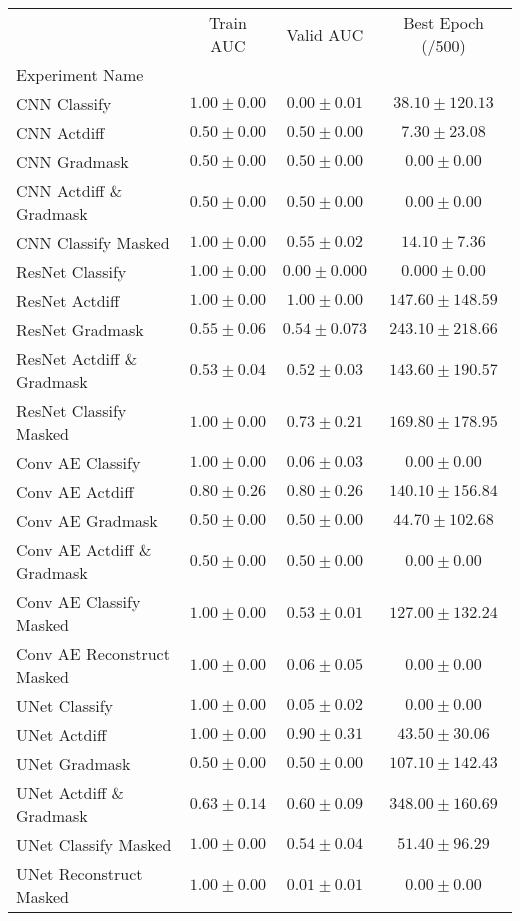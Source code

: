 \begin{tabular}{lccc}
\toprule
{} &        Train AUC &        Valid AUC &           Best Epoch (/500) \\
Experiment Name        &                  &                  &                      \\
\midrule
CNN Classify      &  $1.00\pm0.00$ &  $0.00\pm0.01$ &   $38.10\pm120.13$ \\
CNN Actdiff       &  $0.50\pm0.00$ &  $0.50\pm0.00$ &     $7.30\pm23.08$ \\
CNN Gradmask      &  $0.50\pm0.00$ &  $0.50\pm0.00$ &      $0.00\pm0.00$ \\
CNN Actdiff \& Gradmask  &  $0.50\pm0.00$ &  $0.50\pm0.00$ &      $0.00\pm0.00$ \\
CNN Classify Masked     &  $1.00\pm0.00$ &  $0.55\pm0.02$ &     $14.10\pm7.36$ \\
\midrule
ResNet Classify   &  $1.00\pm0.00$ &  $0.00\pm0.000$ &      $0.000\pm0.00$ \\
ResNet Actdiff    &  $\mathbf{1.00\pm0.00}$ &  $\mathbf{1.00\pm0.00}$ &  $\mathbf{147.60\pm148.59}$ \\
ResNet Gradmask   &  $0.55\pm0.06$ &  $0.54\pm0.073$ &  $243.10\pm218.66$ \\
ResNet Actdiff \& Gradmask   &  $0.53\pm0.04$ &  $0.52\pm0.03$ &  $143.60\pm190.57$ \\
ResNet Classify Masked       &  $1.00\pm0.00$ &  $0.73\pm0.21$ &  $169.80\pm178.95$ \\
\midrule
Conv AE Classify      &  $1.00\pm0.00$ &  $0.06\pm0.03$ &      $0.00\pm0.00$ \\
Conv AE Actdiff       &  $\mathbf{0.80\pm0.26}$ &  $\mathbf{0.80\pm0.26}$ &  $\mathbf{140.10\pm156.84}$ \\
Conv AE Gradmask      &  $0.50\pm0.00$ &  $0.50\pm0.00$ &   $44.70\pm102.68$ \\
Conv AE Actdiff \& Gradmask &  $0.50\pm0.00$ &  $0.50\pm0.00$ &      $0.00\pm0.00$ \\
Conv AE Classify Masked    &  $1.00\pm0.00$ &  $0.53\pm0.01$ &  $127.00\pm132.24$ \\
Conv AE Reconstruct Masked &  $1.00\pm0.00$ &  $0.06\pm0.05$ &      $0.00\pm0.00$ \\
\midrule
UNet Classify    &  $1.00\pm0.00$ &  $0.05\pm0.02$ &      $0.00\pm0.00$ \\
UNet Actdiff     &  $\mathbf{1.00\pm0.00}$ &  $\mathbf{0.90\pm0.31}$ &    $\mathbf{43.50\pm30.06}$ \\
UNet Gradmask    &  $0.50\pm0.00$ &  $0.50\pm0.00$ &  $107.10\pm142.43$ \\
UNet Actdiff \& Gradmask     &  $0.63\pm0.14$ &  $0.60\pm0.09$ &  $348.00\pm160.69$ \\
UNet Classify Masked         &  $1.00\pm0.00$ &  $0.54\pm0.04$ &    $51.40\pm96.29$ \\
UNet Reconstruct Masked      &  $1.00\pm0.00$ &  $0.01\pm0.01$ &      $0.00\pm0.00$ \\
\bottomrule
\end{tabular}
